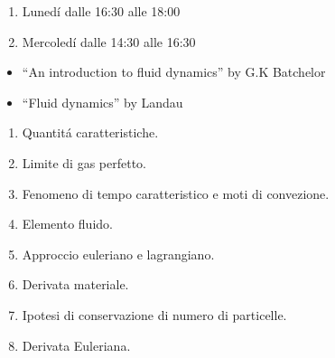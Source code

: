 





\begin{multicols}{2}

  \begin{enumerate}
  \item Luned\'i dalle 16:30 alle 18:00
  \item Mercoled\'i dalle 14:30 alle 16:30
  \end{enumerate}

  \begin{itemize}
  \item ``An introduction to fluid dynamics'' by G.K Batchelor
  \item ``Fluid dynamics'' by Landau
  \end{itemize}

\end{multicols}

\begin{multicols}{2}
  \begin{enumerate}
  \item Quantit\'a caratteristiche.
  \item Limite di gas perfetto.
  \item Fenomeno di tempo caratteristico e moti di convezione.
  \item Elemento fluido.
  \item Approccio euleriano e lagrangiano.
  \item Derivata materiale.
  \item Ipotesi di conservazione di numero di particelle.
  \item Derivata Euleriana.
  \end{enumerate}
  
\end{multicols}




